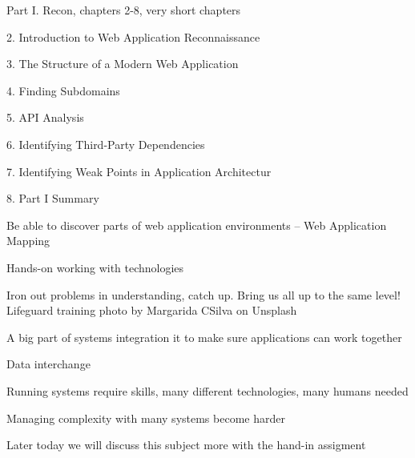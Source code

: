 \documentclass[Screen16to9,17pt]{foils}
\begin{document}
\begin{list1}
\item Part I. Recon, chapters 2-8, very short chapters
\item 2. Introduction to Web Application Reconnaissance
\item 3. The Structure of a Modern Web Application
\item 4. Finding Subdomains
\item 5. API Analysis
\item 6. Identifying Third-Party Dependencies
\item 7. Identifying Weak Points in Application Architectur
\item 8. Part I Summary
\end{list1}



\begin{list1}
\item Be able to discover parts of web application environments -- Web Application Mapping
\item Hands-on working with technologies
\item Iron out problems in understanding, catch up. Bring us all up to the same level!\\
\hfill {\footnotesize Lifeguard training photo by Margarida CSilva on Unsplash}
\end{list1}












\begin{list2}
\item A big part of systems integration it to make sure applications can work together
\item Data interchange
\item Running systems require skills, many different technologies, many humans needed
\item Managing complexity with many systems become harder
\end{list2}

Later today we will discuss this subject more with the hand-in assigment
\end{document}

